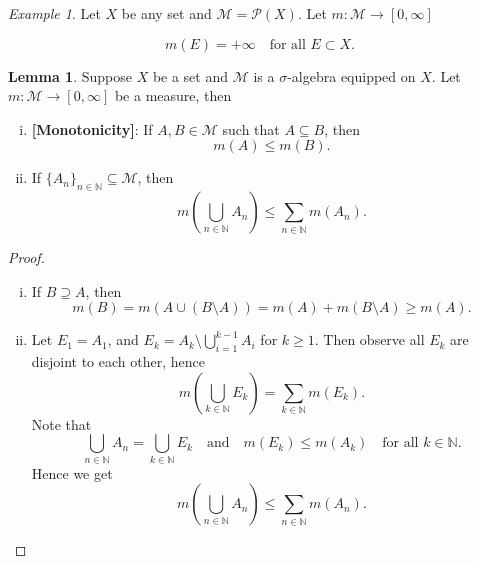 \documentclass[11pt]{article}
\theoremstyle{definition}
\newtheorem{lemma}{Lemma}[section]
\theoremstyle{remark}
\newtheorem{example}{Example}[section]
\begin{document}
\begin{example}\label{ex:infinite_measure}
Let $X$ be any set and $\mathcal{M} = \mathcal{P}(X)$. Let $m : \mathcal{M} \to [0, \infty]$

\[
m(E) = +\infty \quad \text{for all } E \subset X.
\]
\end{example}

\begin{lemma}
Suppose $X$ be a set and $\mathcal{M}$ is a $\sigma$-algebra equipped on $X$. Let $m: \mathcal{M} \to [0, \infty]$ be a measure, then

\begin{enumerate}[(i)]
    \item \textbf{[Monotonicity]}: If $A, B \in \mathcal{M}$ such that $A \subseteq B$, then
    \[
    m(A) \leq m(B).
    \]

    \item If $\{A_n\}_{n \in \mathbb{N}} \subseteq \mathcal{M}$, then
    \[
    m\left(\bigcup_{n \in \mathbb{N}} A_n\right) \leq \sum_{n \in \mathbb{N}} m(A_n).
    \]
\end{enumerate}
\end{lemma}

\begin{proof}
\begin{enumerate}[(i)]
    \item If $B \supseteq A$, then
    \[
    m(B) = m(A \cup (B \setminus A)) = m(A) + m(B \setminus A) \geq m(A).
    \]

    \item Let $E_1 = A_1$, and $E_k = A_k \setminus \bigcup_{i=1}^{k-1} A_i$ for $k \geq 1$. Then observe all $E_k$ are disjoint to each other, hence
    \[
    m\left(\bigcup_{k \in \mathbb{N}} E_k\right) = \sum_{k \in \mathbb{N}} m(E_k).
    \]
    Note that
    \[
    \bigcup_{n \in \mathbb{N}} A_n = \bigcup_{k \in \mathbb{N}} E_k \quad \text{and} \quad m(E_k) \leq m(A_k) \quad \text{for all } k \in \mathbb{N}.
    \]
    Hence we get
    \[
    m\left(\bigcup_{n \in \mathbb{N}} A_n\right) \leq \sum_{n \in \mathbb{N}} m(A_n).
    \]
\end{enumerate}
\end{proof}
\end{document}

